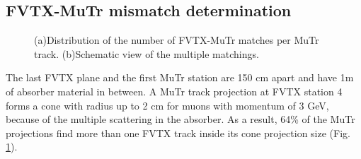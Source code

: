 \documentclass[12pt]{article}
\begin{document}
\subsection{FVTX-MuTr mismatch determination}
\label{sec:mismatch}

\begin{figure}
\begin{center}
	\caption{\label{fig:mismatch}(a)Distribution of the number of FVTX-MuTr matches per MuTr track. (b)Schematic view of the multiple matchings.}
\end{center}
\end{figure}

The last FVTX plane and the first MuTr station are 150 cm apart and have 1m of absorber material in between. A MuTr track projection at FVTX station 4 forms 
a cone with radius up to 2 cm for muons with momentum of 3 GeV, because of the multiple scattering in the absorber. As a result, 64\% of the MuTr projections find 
more than one FVTX track inside its cone projection size (Fig. \ref{fig:mismatch}).
\end{document}
